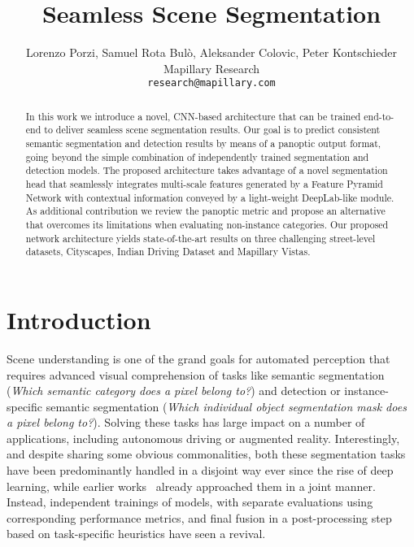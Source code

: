 \documentclass[10pt,twocolumn,letterpaper]{article}
\begin{document}
\captionsetup[table]{position=below}
\title{
\vspace{-25pt}
Seamless Scene Segmentation
\vspace{-10pt}
}

\author{Lorenzo Porzi, Samuel Rota Bul\`o, Aleksander Colovic, Peter Kontschieder\\
Mapillary Research\\
{\tt\small research@mapillary.com}
\vspace{-10pt}
}

\maketitle


\begin{abstract}
In this work we introduce a novel, CNN-based architecture that can be trained end-to-end to deliver seamless scene segmentation results. Our goal is to predict consistent semantic segmentation and detection results by means of a panoptic output format, going beyond the simple combination of independently trained segmentation and detection models. The proposed architecture takes advantage of a novel segmentation head that seamlessly integrates multi-scale features generated by a Feature Pyramid Network with contextual information conveyed by a light-weight DeepLab-like module. As additional contribution we review the panoptic metric and propose an alternative that overcomes its limitations when evaluating non-instance categories. Our proposed network architecture yields state-of-the-art results on three challenging street-level datasets, \ie Cityscapes, Indian Driving Dataset and Mapillary Vistas.
	\vspace{-10pt}
\end{abstract}

\section{Introduction}
Scene understanding is one of the grand goals for automated perception that requires advanced visual comprehension of tasks like semantic segmentation (\textit{Which semantic category does a pixel belong to?}) and detection or instance-specific semantic segmentation (\textit{Which individual object segmentation mask does a pixel belong to?}). Solving these tasks has large impact on a number of applications, including autonomous driving or augmented reality. Interestingly, and despite sharing some obvious commonalities, both these segmentation tasks have been predominantly handled in a disjoint way ever since the rise of deep learning, while earlier works~\cite{Tu+05,YaoFU12,Tighe2014} already approached them in a joint manner. Instead, independent trainings of models, with separate evaluations using corresponding performance metrics, and final fusion in a post-processing step based on task-specific heuristics have seen a revival.
\end{document}
